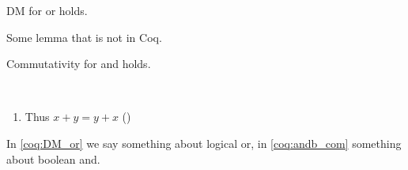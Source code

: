 \documentclass{llncs}
\begin{document}
\begin{theorem}[][DM_or]
  DM for or holds.
\end{theorem}

\begin{lemma}[Name]
  Some lemma that is not in Coq.
\end{lemma}

\begin{fact}
  Commutativity for and holds.
\end{fact}

\begin{fact}~
  \begin{enumerate}
  \coqitem[plus_O] $x + 0 = x$
  \coqitem[plus_S] $x + S y = S (x + y)$
  \item Thus $x + y = y + x$ ()
\end{enumerate}
\end{fact}

In \autoref{coq:DM_or} we say something about logical or, in
\autoref{coq:andb_com} something about boolean and.
\end{document}
